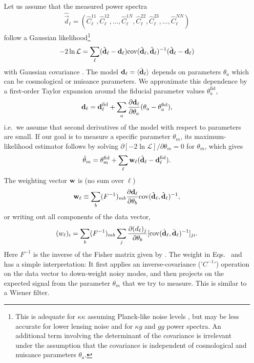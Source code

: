\documentclass[prd,superscriptaddress,floatfix,notitlepage,nofootinbib,reprint]{revtex4-1} %
\begin{document}
Let us assume that the measured power spectra
\begin{align}
  \label{eq:7}
 \hat{\vec d}_\ell = 
(\hat C^{11}_{\ell}, \hat C^{12}_{\ell}, \dots, \hat C^{1N}_{\ell}, 
\hat C^{22}_{\ell}, \hat C^{23}_{\ell},  
  \dots,
\hat C^{NN}_{\ell})
\end{align}
follow a Gaussian likelihood\footnote{This is adequate for $\kappa\kappa$ assuming Planck-like noise levels \cite{Marcel1308}, but may be less accurate for lower lensing noise and for $\kappa g$ and $gg$ power spectra.
An additional term involving the determinant of the covariance is irrelevant under the assumption that the covariance is independent of cosmological and nuisance parameters $\theta_a$.  
}
\begin{align}
  \label{eq:12}
  -2 \ln \mathcal{L} = \sum_\ell (\hat{\textbf{d}}_\ell-\textbf{d}_\ell)\mathrm{cov}(\hat{\textbf{d}}_\ell,\hat{\textbf{d}}_\ell)^{-1}(\hat{\textbf{d}}_\ell-\textbf{d}_\ell)
\end{align}
with Gaussian covariance .
The model $\textbf{d}_\ell = \langle\hat{\textbf{d}}_\ell\rangle$ depends on parameters $\theta_a$ which can be cosmological or nuisance parameters.
We approximate this dependence by a first-order Taylor expansion around the fiducial parameter values $\theta_a^\mathrm{fid}$,
\begin{align}
  \label{eq:13}
  \textbf{d}_\ell = \textbf{d}_\ell^\mathrm{fid} + \sum_a\frac{\partial \textbf{d}_\ell}{\partial\theta_a}(\theta_a-\theta_a^\mathrm{fid}),
\end{align}
i.e.~we assume that second derivatives of the model with respect to parameters are small.
If our goal is to measure a specific parameter $\theta_m$, its maximum-likelihood estimator follows by solving $\partial[-2\ln\mathcal{L}]/\partial\theta_m=0$ for $\theta_m$, which gives
\begin{align} 
  \label{eq:ThetaiEsti}
  \hat\theta_m = \theta_m^\mathrm{fid} + \sum_\ell 
\textbf{w}_\ell
(\hat{\textbf{d}}_\ell-\textbf{d}_\ell^\mathrm{fid}).
\end{align}
The weighting vector $\textbf{w}$ is (no sum over $\ell$)
\begin{align}
  \label{eq:optimalWeightClcombi}
\textbf{w}_\ell\equiv \sum_b (F^{-1})_{mb}\frac{\partial\textbf{d}_\ell}{\partial\theta_b}
\mathrm{cov}(\hat{\textbf{d}}_\ell,\hat{\textbf{d}}_\ell)^{-1},
\end{align}
or writing out all components of the data vector,
\begin{align}
  \label{eq:optimalWeightClcombi2}
(w_\ell)_i=\sum_{b} (F^{-1})_{mb}\sum_j\frac{\partial(d_\ell)_j}{\partial\theta_b}
[\mathrm{cov}(\hat{\textbf{d}}_\ell,\hat{\textbf{d}}_\ell)^{-1}]_{ji}.
\end{align}
Here $F^{-1}$ is the inverse of the Fisher matrix given by .
The weight in Eqs.~ and  has a simple interpretation: It first applies an inverse-covariance ('$C^{-1}$') operation on the data vector to down-weight noisy modes, and then projects on the expected signal from the parameter $\theta_m$ that we try to measure.
This is similar to a Wiener filter.
\end{document}
